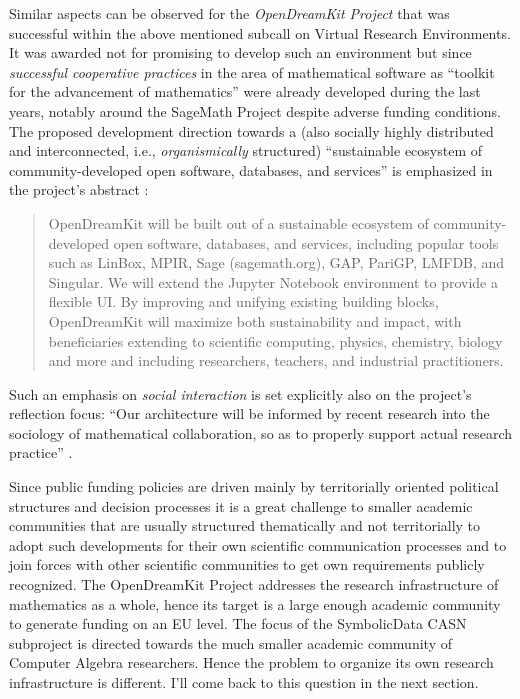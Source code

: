 \documentclass{llncs}
\newcommand{\SD}{{\sc Symbo\-lic\-Data}}
\begin{document}
Similar aspects can be observed for the \emph{OpenDreamKit Project} \cite{odk}
that was successful within the above mentioned subcall on Virtual Research
Environments.  It was awarded not for promising to develop such an environment
but since \emph{successful cooperative practices} in the area of mathematical
software as ``toolkit for the advancement of mathematics'' were already
developed during the last years, notably around the SageMath Project
\cite{sagemath} despite adverse funding conditions.  The proposed development
direction towards a (also socially highly distributed and interconnected, i.e.,
\emph{organismically} structured) ``sustainable ecosystem of
community-developed open software, databases, and services'' is emphasized in
the project's abstract \cite{odk}:
\begin{quote}
  OpenDreamKit will be built out of a sustainable ecosystem of
  community-developed open software, databases, and services, including popular
  tools such as LinBox, MPIR, Sage (sagemath.org), GAP, PariGP, LMFDB, and
  Singular. We will extend the Jupyter Notebook environment to provide a
  flexible UI. By improving and unifying existing building blocks, OpenDreamKit
  will maximize both sustainability and impact, with beneficiaries extending to
  scientific computing, physics, chemistry, biology and more and including
  researchers, teachers, and industrial practitioners.
\end{quote}
Such an emphasis on \emph{social interaction} is set explicitly also on the
project's reflection focus: ``Our architecture will be informed by recent
research into the sociology of mathematical collaboration, so as to properly
support actual research practice'' \cite{odk}.
\medskip

Since public funding policies are driven mainly by territorially oriented
political structures and decision processes it is a great challenge to smaller
academic communities that are usually structured thematically and not
territorially to adopt such developments for their own scientific communication
processes and to join forces with other scientific communities to get own
requirements publicly recognized.  The OpenDreamKit Project addresses the
research infrastructure of mathematics as a whole, hence its target is a large
enough academic community to generate funding on an EU level. The focus of the
{\SD} CASN subproject is directed towards the much smaller academic community
of Computer Algebra researchers.  Hence the problem to organize its own
research infrastructure is different. I'll come back to this question in the
next section.  
\medskip
\end{document}
